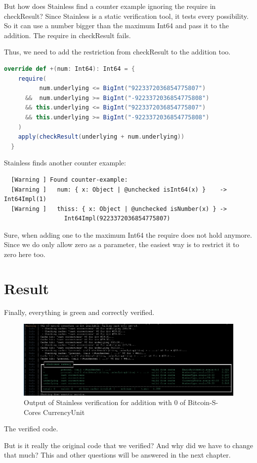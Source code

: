 But how does Stainless find a counter example ignoring the require in checkResult?
Since Stainless is a static verification tool, it tests every possibility.
So it can use a number bigger than the maximum Int64 and pass it to the addition.
The require in checkResult fails.

Thus, we need to add the restriction from checkResult to the addition too.
\begin{lstlisting}[language=scala]
  override def +(num: Int64): Int64 = {
    require(
          num.underlying <= BigInt("9223372036854775807")
      &&  num.underlying >= BigInt("-9223372036854775808")
      && this.underlying <= BigInt("9223372036854775807")
      && this.underlying >= BigInt("-9223372036854775808")
    )
    apply(checkResult(underlying + num.underlying))
  }
\end{lstlisting}

Stainless finds another counter example:
{\footnotesize\begin{verbatim}
  [Warning ] Found counter-example:
  [Warning ]   num: { x: Object | @unchecked isInt64(x) }    -> Int64Impl(1)
  [Warning ]   thiss: { x: Object | @unchecked isNumber(x) } ->
                 Int64Impl(9223372036854775807)
\end{verbatim}}

Sure, when adding one to the maximum Int64 the require does not hold anymore.
Since we do only allow zero as a parameter, the easiest way is to restrict it to zero here too.


\section{Result}

Finally, everything is green and correctly verified.
\begin{figure}[H]
	\centering
		\includegraphics[scale=0.45]{images/final_verify_output.png}
	\caption{Output of Stainless verification for addition with 0 of Bitcoin-S-Cores CurrencyUnit}
	\label{fig:output1}
\end{figure}

The verified code.


But is it really the original code that we verified?
And why did we have to change that much?
This and other questions will be answered in the next chapter.
